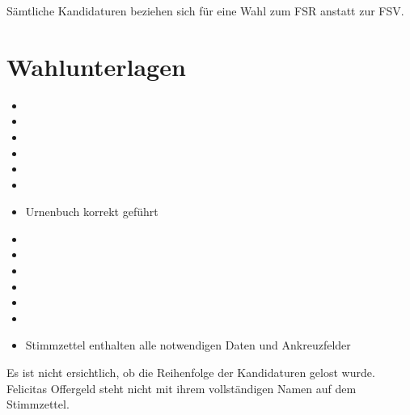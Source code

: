 \documentclass[a4paper]{scrartcl}
\newcommand{\fullcheck}{\raisebox{-.8\dp\strutbox}{\texttt{[image: Check.pdf]}}}
\newcommand{\semicheck}{\raisebox{-.8\dp\strutbox}{\texttt{[image: Semicheck.pdf]}}}
\newcommand{\nocheck}{\raisebox{-.8\dp\strutbox}{\texttt{[image: Nocheck.pdf]}}}
\newcommand{\dontknow}{\raisebox{-.8\dp\strutbox}{\texttt{[image: Dontknow.pdf]}}}
\newcommand{\notrev}{\raisebox{-.8\dp\strutbox}{\texttt{[image: Notrev.pdf]}}}
\newcommand{\sym}[1]{
\ifcase#1 \item[$\Box$]
\or \item[\fullcheck]
\or \item[\semicheck]
\or \item[\nocheck]
\or \item[\dontknow]
\or \item[\notrev]
\else \item[$\Box$]
\fi}
\begin{document}







Sämtliche Kandidaturen beziehen sich für eine Wahl zum FSR anstatt zur FSV.

\section{Wahlunterlagen}
\begin{itemize}[label=$\Box$]
\sym{1} Urnenbuch korrekt geführt
\sym{2} Stimmzettel enthalten alle notwendigen Daten und Ankreuzfelder
\end{itemize}




Es ist nicht ersichtlich, ob die Reihenfolge der Kandidaturen gelost wurde.
Felicitas Offergeld steht nicht mit ihrem vollständigen Namen auf dem Stimmzettel.
\end{document}
